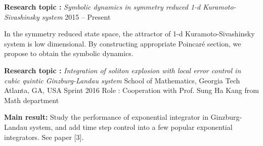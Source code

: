 \begin{cventries}
\cventry
{\textbf{Research topic :} \emph{Symbolic dynamics in symmetry reduced 1-d Kuramoto-Sivashinsky system}}
{}{}
{2015 -- Present}
{
  \begin{cvitems}
      \item {In the symmetry reduced state space, the attractor of  1-d Kuramoto-Sivashinsky system
          is low dimensional. By constructing appropriate Poincar\'e section, we propose to obtain the
          symbolic dynamics. }
  \end{cvitems}
}


\cventrymore
{\textbf{Research topic :} \emph{Integration of soliton explosion with local error control in cubic quintic 
  Ginzburg-Landau system}}
{School of Mathematics, Georgia Tech} 
{Atlanta, GA, USA} %
{Sprint 2016} %
{Role : Cooperation with Prof. Sung Ha Kang from Math department}
{
  \begin{cvitems}
  \item {\textbf{Main result:}  Study the performance of exponential integrator in Ginzburg-Landau system,
      and add time step control into a few popular exponential integrators. See paper [3].}
  \end{cvitems}
}





\end{cventries}
